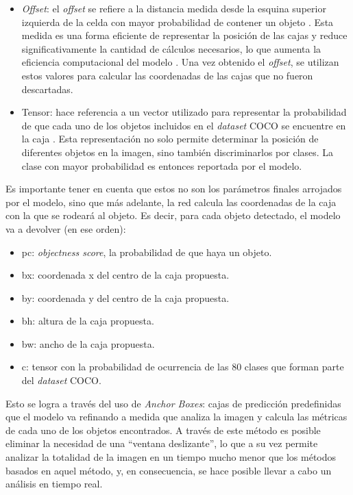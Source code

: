 \begin{itemize}
	
	\item \textit{Offset}: el \textit{offset} se refiere a la distancia medida desde la esquina superior izquierda de la celda con mayor probabilidad de contener un objeto \cite{10}. Esta medida es una forma eficiente de representar la posición de las cajas y reduce significativamente la cantidad de cálculos necesarios, lo que aumenta la eficiencia computacional del modelo \cite{9}. Una vez obtenido el \textit{offset}, se utilizan estos valores para calcular las coordenadas de las cajas que no fueron descartadas.
	\item Tensor: hace referencia a un vector utilizado para representar la probabilidad \cite{11} de que cada uno de los objetos incluidos en el \textit{dataset} COCO \cite{3} se encuentre en la caja . Esta representación no solo permite determinar la posición de diferentes objetos en la imagen, sino también discriminarlos por clases. La clase con mayor probabilidad es entonces reportada por el modelo.  
\end{itemize}

Es importante tener en cuenta que estos no son los parámetros finales arrojados por el modelo, sino que más adelante, la red calcula las coordenadas de la caja con la que se rodeará al objeto. Es decir, para cada objeto detectado, el modelo va a devolver (en ese orden):

\begin{itemize}
	\item pc: \textit{objectness score}, la probabilidad de que haya un objeto.
	\item bx: coordenada x del centro de la caja propuesta.
	\item by: coordenada y del centro de la caja propuesta.
	\item bh: altura de la caja propuesta.
	\item bw: ancho de la caja propuesta.
	\item c: tensor con la probabilidad de ocurrencia de las 80 clases que forman parte del \textit{dataset} COCO.
\end{itemize}


Esto se logra a través del uso de \textit{Anchor Boxes}: cajas de predicción predefinidas que el modelo va refinando a medida que analiza la imagen y calcula las métricas de cada uno de los objetos encontrados. A través de este método es posible eliminar la necesidad de una “ventana deslizante”, lo que a su vez permite analizar la totalidad de la imagen en un tiempo mucho menor que los métodos basados en aquel método, y, en consecuencia, se hace posible llevar a cabo un análisis en tiempo real. 

